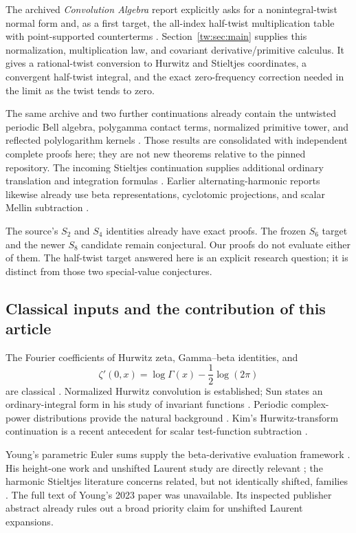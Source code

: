 \documentclass[11pt,letterpaper]{article}
\numberwithin{equation}{section}
\theoremstyle{plain}
\theoremstyle{definition}
\theoremstyle{remark}
\begin{document}
The archived \emph{Convolution Algebra} report explicitly asks for a
nonintegral-twist normal form and, as a first target, the all-index
half-twist multiplication table with point-supported counterterms
\cite[final research section]{RepoConvolutionAlgebra}.
Section~\ref{tw:sec:main} supplies this normalization, multiplication
law, and covariant derivative/primitive calculus. It gives a
rational-twist conversion to Hurwitz and Stieltjes coordinates, a
convergent half-twist integral, and the exact zero-frequency correction
needed in the limit as the twist tends to zero.

The same archive and two further continuations already contain the
untwisted periodic Bell algebra, polygamma contact terms, normalized
primitive tower, and reflected polylogarithm kernels
\cite{RepoConvolutionAlgebra,RepoConvolutionCalculus,RepoShiftedJets}.
Those results are consolidated with independent complete proofs here;
they are not new theorems relative to the pinned repository.
The incoming Stieltjes continuation supplies additional ordinary
translation and integration formulas \cite{RepoIncoming}.
Earlier alternating-harmonic reports likewise already use beta
representations, cyclotomic projections, and scalar Mellin subtraction
\cite{RepoAlternating,RepoHarmonicGeometry}.

The source's \(S_2\) and \(S_4\) identities already have exact proofs.
The frozen \(S_6\) target and the newer \(S_8\) candidate remain
conjectural. Our proofs do not evaluate either of them.
The half-twist target answered here is an explicit research question;
it is distinct from those two special-value conjectures.

\subsection{Classical inputs and the contribution of this article}

The Fourier coefficients of Hurwitz zeta, Gamma--beta identities, and
\[
 \zeta'(0,x)=\log\Gamma(x)-\frac12\log(2\pi)
\]
are classical \cite{DLMFHurwitz,DLMFBeta}.
Normalized Hurwitz convolution is established; Sun states an
ordinary-integral form in his study of invariant functions
\cite[Remark 3.2 in the arXiv version]{per:Sun}.
Periodic complex-power distributions provide the natural background
\cite{per:GaySebbar}. Kim's Hurwitz-transform continuation is a recent
antecedent for scalar test-function subtraction \cite{Kim2026}.

Young's parametric Euler sums supply the beta-derivative evaluation
framework \cite{Young2026}. His height-one work and unshifted Laurent
study are directly relevant \cite{Young2024,Young2023}; the harmonic
Stieltjes literature concerns related, but not identically shifted,
families \cite{HarmonicStieltjes2023}. The full text of Young's 2023
paper was unavailable. Its inspected publisher abstract already rules
out a broad priority claim for unshifted Laurent expansions.
\end{document}
